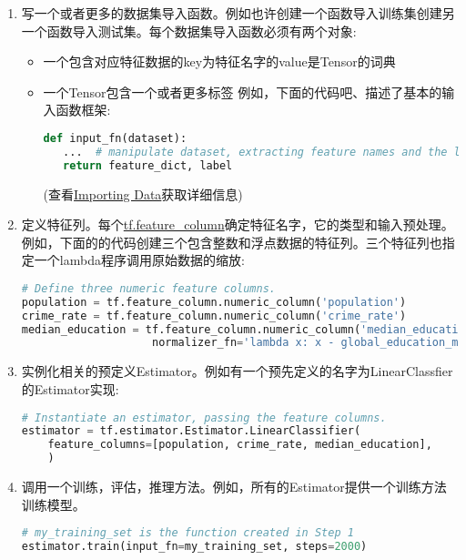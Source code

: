 \begin{enumerate}
\item 写一个或者更多的数据集导入函数。例如也许创建一个函数导入训练集创建另一个函数导入测试集。每个数据集导入函数必须有两个对象:
\begin{itemize}
\item 一个包含对应特征数据的key为特征名字的value是Tensor的词典
\item 一个Tensor包含一个或者更多标签\newline
例如，下面的代码吧、描述了基本的输入函数框架:
\begin{lstlisting}[language=Python]
def input_fn(dataset):
   ...  # manipulate dataset, extracting feature names and the label
   return feature_dict, label
\end{lstlisting}
(查看\href{https://www.tensorflow.org/programmers_guide/datasets?hl=zh-cn}{Importing Data}获取详细信息)
\end{itemize}
\item 定义特征列。每个\href{https://www.tensorflow.org/api_docs/python/tf/feature_column?hl=zh-cn}{tf.feature\_column}确定特征名字，它的类型和输入预处理。例如，下面的的代码创建三个包含整数和浮点数据的特征列。三个特征列也指定一个lambda程序调用原始数据的缩放:\newline
\begin{lstlisting}[language=Python]
# Define three numeric feature columns.
population = tf.feature_column.numeric_column('population')
crime_rate = tf.feature_column.numeric_column('crime_rate')
median_education = tf.feature_column.numeric_column('median_education',
                    normalizer_fn='lambda x: x - global_education_mean')
\end{lstlisting}
\item 实例化相关的预定义Estimator。例如有一个预先定义的名字为LinearClassfier 的Estimator实现:
\begin{lstlisting}[language=Python]
# Instantiate an estimator, passing the feature columns.
estimator = tf.estimator.Estimator.LinearClassifier(
    feature_columns=[population, crime_rate, median_education],
    )
\end{lstlisting}

\item 调用一个训练，评估，推理方法。例如，所有的Estimator提供一个训练方法训练模型。\newline
\begin{lstlisting}[language=Python]
# my_training_set is the function created in Step 1
estimator.train(input_fn=my_training_set, steps=2000)
\end{lstlisting}
\end{enumerate}
